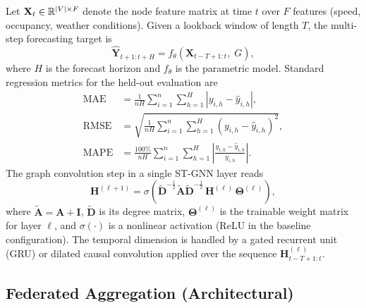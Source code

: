 Let $\mathbf{X}_t \in \mathbb{R}^{|V| \times F}$ denote the node feature matrix
at time $t$ over $F$ features (speed, occupancy, weather conditions).
Given a lookback window of length $T$, the multi-step forecasting target is
\begin{equation}
  \hat{\mathbf{Y}}_{t+1:t+H} = f_\theta\!\left(
    \mathbf{X}_{t-T+1:t},\; G\right),
  \label{eq:forecast}
\end{equation}
where $H$ is the forecast horizon and $f_\theta$ is the parametric model.
Standard regression metrics for the held-out evaluation are
\begin{align}
  \mathrm{MAE}  &= \frac{1}{nH}\sum_{i=1}^{n}\sum_{h=1}^{H}
                   \left|y_{i,h} - \hat{y}_{i,h}\right|,
                   \label{eq:mae} \\
  \mathrm{RMSE} &= \sqrt{\frac{1}{nH}\sum_{i=1}^{n}\sum_{h=1}^{H}
                   \left(y_{i,h} - \hat{y}_{i,h}\right)^2},
                   \label{eq:rmse} \\
  \mathrm{MAPE} &= \frac{100\%}{nH}\sum_{i=1}^{n}\sum_{h=1}^{H}
                   \left|\frac{y_{i,h} - \hat{y}_{i,h}}{y_{i,h}}\right|.
                   \label{eq:mape}
\end{align}
The graph convolution step in a single ST-GNN layer reads
\begin{equation}
  \mathbf{H}^{(\ell+1)} = \sigma\!\left(
    \tilde{\mathbf{D}}^{-\tfrac{1}{2}}\tilde{\mathbf{A}}
    \tilde{\mathbf{D}}^{-\tfrac{1}{2}}\,
    \mathbf{H}^{(\ell)}\,\mathbf{\Theta}^{(\ell)}\right),
  \label{eq:gcn}
\end{equation}
where $\tilde{\mathbf{A}} = \mathbf{A} + \mathbf{I}$,
$\tilde{\mathbf{D}}$ is its degree matrix,
$\mathbf{\Theta}^{(\ell)}$ is the trainable weight matrix for layer $\ell$,
and $\sigma(\cdot)$ is a nonlinear activation (ReLU in the baseline
configuration).
The temporal dimension is handled by a gated recurrent unit (GRU) or
dilated causal convolution applied over the sequence
$\mathbf{H}^{(\ell)}_{t-T+1:t}$.

\subsection{Federated Aggregation (Architectural)}

